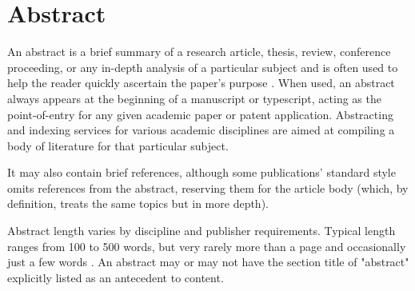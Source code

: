 \chapter*{Abstract}
\label{cha:abstract}

An abstract is a brief summary of a research article, thesis, review, conference proceeding, or any in-depth analysis of a particular subject and is often used to help the reader quickly ascertain the paper's purpose \cite{blake1993elements}. When used, an abstract always appears at the beginning of a manuscript or typescript, acting as the point-of-entry for any given academic paper or patent application. Abstracting and indexing services for various academic disciplines are aimed at compiling a body of literature for that particular subject.

It may also contain brief references, although some publications' standard style omits references from the abstract, reserving them for the article body (which, by definition, treats the same topics but in more depth).

Abstract length varies by discipline and publisher requirements. Typical length ranges from 100 to 500 words, but very rarely more than a page and occasionally just a few words \cite{berry2011can}. An abstract may or may not have the section title of "abstract" explicitly listed as an antecedent to content.